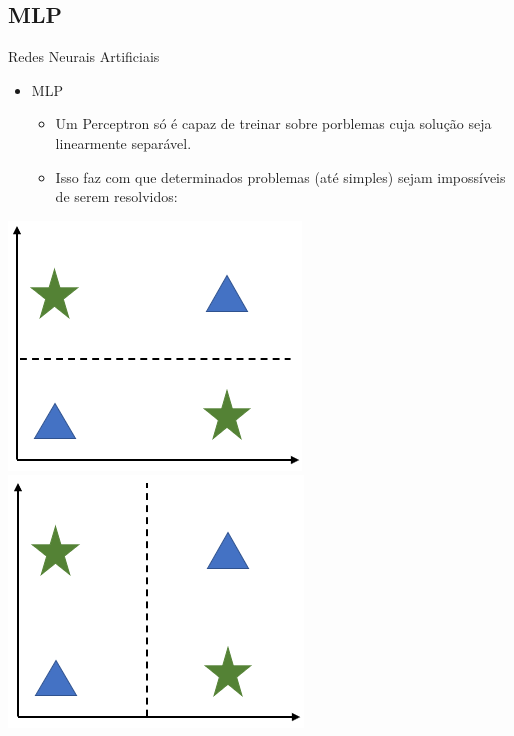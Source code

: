 \documentclass{libs/ufc_format}
\begin{document}
\subsection{MLP}

\begin{frame}{Redes Neurais Artificiais}
    \begin{itemize}
        \item MLP
            \begin{itemize}
                \justifying
                \item Um Perceptron só é capaz de treinar sobre porblemas cuja solução seja linearmente separável.
                \item<2-> Isso faz com que determinados problemas (até simples) sejam impossíveis de serem resolvidos:\\
            \end{itemize}
    \end{itemize}
    \centering
    \includegraphics[scale=0.4]{media/perceptron_1}
    \includegraphics[scale=0.4]{media/perceptron_2}\\

\end{frame}
\end{document}
